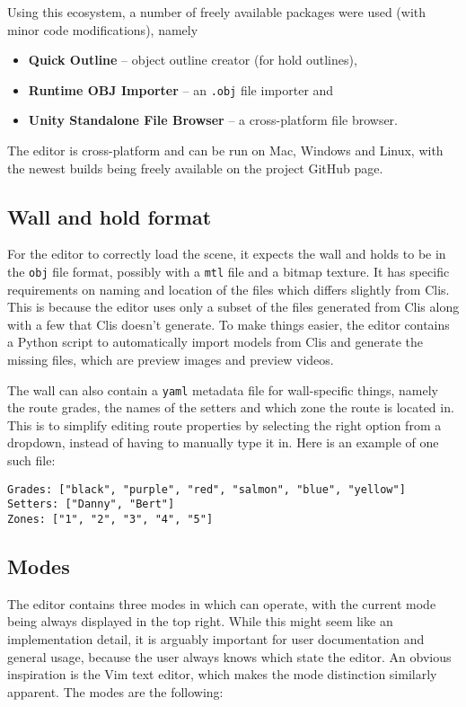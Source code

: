 Using this ecosystem, a number of freely available packages were used (with minor code modifications), namely

\begin{itemize}
	\item \textbf{Quick Outline} \cite{quickoutline} -- object outline creator (for hold outlines),
	\item \textbf{Runtime OBJ Importer} \cite{objimport} -- an \verb|.obj| file importer and
	\item \textbf{Unity Standalone File Browser} \cite{unitystandalonefilebrowser} -- a cross-platform file browser.
\end{itemize}

The editor is cross-platform and can be run on Mac, Windows and Linux, with the newest builds being freely available on the project GitHub page.

\subsection{Wall and hold format}
For the editor to correctly load the scene, it expects the wall and holds to be in the \verb|obj| file format, possibly with a \verb|mtl| file and a bitmap texture.
It has specific requirements on naming and location of the files which differs slightly from Clis.
This is because the editor uses only a subset of the files generated from Clis along with a few that Clis doesn't generate.
To make things easier, the editor contains a Python script to automatically import models from Clis and generate the missing files, which are preview images and preview videos.

The wall can also contain a \verb|yaml| metadata file for wall-specific things, namely the route grades, the names of the setters and which zone the route is located in.
This is to simplify editing route properties by selecting the right option from a dropdown, instead of having to manually type it in.
Here is an example of one such file:

\begin{verbatim}
Grades: ["black", "purple", "red", "salmon", "blue", "yellow"]
Setters: ["Danny", "Bert"]
Zones: ["1", "2", "3", "4", "5"]
\end{verbatim}

\subsection{Modes}
The editor contains three modes in which can operate, with the current mode being always displayed in the top right.
While this might seem like an implementation detail, it is arguably important for user documentation and general usage, because the user always knows which state the editor.
An obvious inspiration is the Vim text editor, which makes the mode distinction similarly apparent.
The modes are the following:


